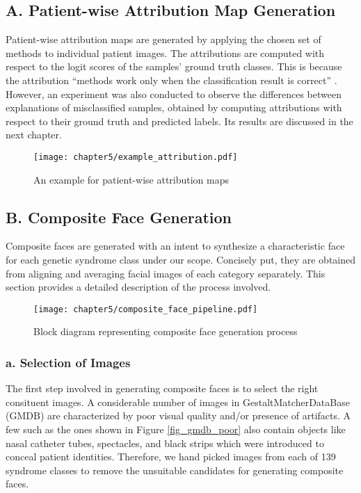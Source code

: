 \documentclass[../report.tex]{subfiles}
\begin{document}
    \subsection{A. Patient-wise Attribution Map Generation}
    Patient-wise attribution maps are generated by applying the chosen set of methods to individual patient images. The attributions are computed with respect to the logit scores of the samples' ground truth classes. This is because the attribution \enquote{methods work only when the classification result is correct} \cite{muhammad2020eigen}. However, an experiment was also conducted to observe the differences between explanations of misclassified samples, obtained by computing attributions with respect to their ground truth and predicted labels. Its results are discussed in the next chapter.
    \begin{figure}[H]
    	\hspace*{0cm}      
    	\texttt{[image: chapter5/example\_attribution.pdf]}
    	\caption{An example for patient-wise attribution maps}
    	\label{fig_gm_pipeline}
    \end{figure}
    \subsection{B. Composite Face Generation}
    Composite faces are generated with an intent to synthesize a characteristic face for each genetic syndrome class under our scope. Concisely put, they are obtained from aligning and averaging facial images of each category separately. This section provides a detailed description of the process involved.
       \begin{figure}[H]
    	\hspace*{-0.5cm}      
    	\texttt{[image: chapter5/composite\_face\_pipeline.pdf]}
    	\caption{Block diagram representing composite face generation process}
    	\label{fig_gm_pipeline}
    \end{figure}
    
    \subsubsection{a. Selection of Images}
    The first step involved in generating composite faces is to select the right consituent images. A considerable number of images in GestaltMatcherDataBase (GMDB) are characterized by poor visual quality and/or presence of artifacts. A few such as the ones shown in Figure \ref{fig_gmdb_poor} also contain objects like nasal catheter tubes, spectacles, and black strips which were introduced to conceal patient identities. Therefore, we hand picked images from each of 139 syndrome classes to remove the unsuitable candidates for generating composite faces.
    
\end{document}
